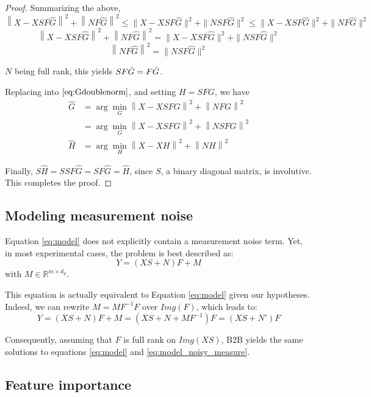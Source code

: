 \begin{proof}
Summarizing the above,
$$\left \| X - XSF\hat G\right\| ^2  + \left \| NF\hat G\right \| ^2 \leq \| X - XSF\hat G \| ^2  + \| NSF\hat G \| ^2 \leq \| X - XSF\hat G \| ^2  + \| NF\hat G \| ^2$$
$$\left \| X - XSF\hat G\right\| ^2  + \left \| NF\hat G\right \| ^2 = \| X - XSF\hat G \| ^2  + \| NSF\hat G \| ^2$$
$$\left \| NF\hat G\right \| ^2 =  \| NSF\hat G \| ^2$$

$N$ being full rank, this yields $SF\hat G = F\Hat G$.

Replacing into $\eqref{eq:Gdoublenorm}$, and setting $H = SFG$, we have
\begin{align*}
	\hat G &=  \arg \min_G  \left \| X - XSFG\right \| ^2  + \left \| NFG\right \| ^2 \\
	&=   \arg \min_G \left \| X - XSFG\right \| ^2  + \left \| NSFG\right \| ^2 \\
	\hat H &=  \arg \min_H \left \| X - XH\right \| ^2  + \left \| NH\right \| ^2
	\label{eq:4}
\end{align*}

Finally, $S\hat H = S SF\hat G = SF\hat G = \hat H$, since $S$, a binary
diagonal matrix, is involutive. This completes the proof.
\end{proof}



\newpage
\subsection{Modeling measurement noise}

Equation \ref{eq:model} does not explicitly contain a measurement noise term.
Yet, in most experimental cases, the problem is best described as:
\begin{equation}
  Y = (XS+N)F+M
  \label{eq:model_noisy_measure}
\end{equation}
  with $M\in \mathbb{R}^{m \times d_y}$.

This equation is actually equivalent to Equation \ref{eq:model} given our
hypotheses. Indeed, we can rewrite $M = MF^{-1}F$ over $Img(F)$, which leads to:
$$Y = (XS+N)F+M = (XS+N+MF^{-1})F = (XS+N')F$$

Consequently, assuming that $F$ is full rank on $Img(XS)$, B2B yields the same
solutions to equations \ref{eq:model} and \ref{eq:model_noisy_measure}.


\subsection{Feature importance}
\label{appendix:feature_importance}

